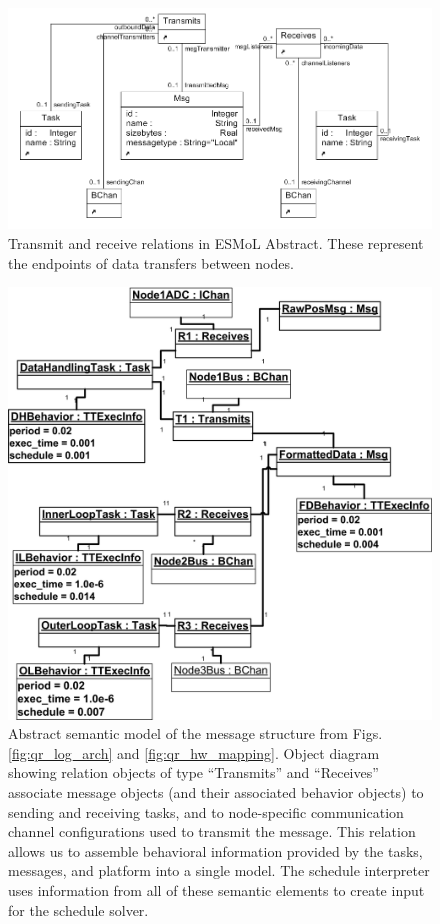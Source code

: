 \begin{figure}
\centering
\includegraphics[width=0.9\columnwidth]{figures/tran_rcv.png}
    \caption{Transmit and receive relations in ESMoL Abstract. These
represent the endpoints of data transfers between nodes.}
    \label{fig:trnrcv_meta}
\end{figure}

\begin{figure}
\centering
\includegraphics[width=0.87\columnwidth]{figures/msg_struct.png}
    \caption{Abstract semantic model of the message structure from Figs.
\ref{fig:qr_log_arch} and \ref{fig:qr_hw_mapping}. Object diagram showing relation 
objects of type "`Transmits"' and "`Receives"' associate message objects (and their associated behavior objects) 
to sending and receiving tasks, and to node-specific communication channel configurations used to transmit the 
message.  This relation allows us to assemble behavioral information provided by the tasks, messages, and 
platform into a single model.  The schedule interpreter uses information from all of these semantic elements to 
create input for the schedule solver. }
    \label{fig:msg_sched}
\end{figure}
